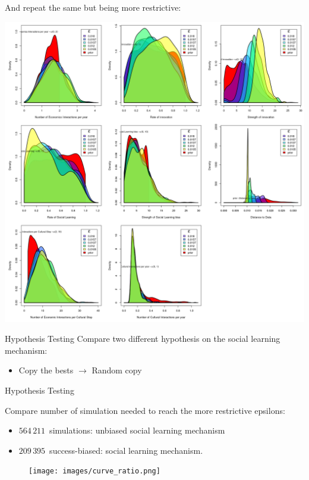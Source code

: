 \documentclass[10pt, notes=show]{beamer}
\begin{document}
\begin{frame}
    And repeat the same but being more restrictive:
    \vspace{20pt}

\end{frame}

\begin{frame}
    \centering
    \includegraphics[height=0.95\textheight]{images/result_abc_rand.png}
\end{frame}

\begin{frame}{Hypothesis Testing}
    Compare two different hypothesis on the social learning mechanism:
    \begin{itemize}
        \item Copy the bests $\rightarrow$ Random copy 
    \end{itemize}
\end{frame}


\begin{frame}{Hypothesis Testing}

    Compare number of simulation needed to reach the more restrictive epsilons:
    \begin{itemize}
        \item $564\,211$~simulations: unbiased social learning mechanism 
        \item $209\,395$~success-biased: social learning mechanism. 
    \end{itemize}
    \begin{figure}
        \texttt{[image: images/curve\_ratio.png]}
    \end{figure}
\end{frame}
\end{document}
